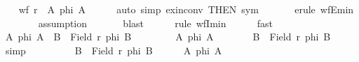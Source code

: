 \begin{isabellebody}
\ \ \isamarkupfalse%
\ {\isachardoublequoteopen}wf\ r\ {\isasymlongleftrightarrow}\ {\isacharparenleft}{\kern0pt}{\isasymforall}A{\isachardot}{\kern0pt}\ {\isacharquery}{\kern0pt}phi\ A{\isacharparenright}{\kern0pt}{\isachardoublequoteclose}\isanewline
\ \ \ \ \isamarkupfalse%
\ {\isacharparenleft}{\kern0pt}auto\ simp{\isacharcolon}{\kern0pt}\ ex{\isacharunderscore}{\kern0pt}in{\isacharunderscore}{\kern0pt}conv\ {\isacharbrackleft}{\kern0pt}THEN\ sym{\isacharbrackright}{\kern0pt}{\isacharparenright}{\kern0pt}\isanewline
\ \ \ \ \ \isamarkupfalse%
\ {\isacharparenleft}{\kern0pt}erule\ wfE{\isacharunderscore}{\kern0pt}min{\isacharparenright}{\kern0pt}\isanewline
\ \ \ \ \ \ \isamarkupfalse%
\ assumption\isanewline
\ \ \ \ \ \isamarkupfalse%
\ blast\isanewline
\ \ \ \ \isamarkupfalse%
\ {\isacharparenleft}{\kern0pt}rule\ wfI{\isacharunderscore}{\kern0pt}min{\isacharparenright}{\kern0pt}\isanewline
\ \ \ \ \isamarkupfalse%
\ fast\isanewline
\ \ \ \ \isamarkupfalse%
\isanewline
\ \ \isamarkupfalse%
\ \isamarkupfalse%
\ {\isachardoublequoteopen}{\isacharparenleft}{\kern0pt}{\isasymforall}A{\isachardot}{\kern0pt}\ {\isacharquery}{\kern0pt}phi\ A{\isacharparenright}{\kern0pt}\ {\isasymlongleftrightarrow}\ {\isacharparenleft}{\kern0pt}{\isasymforall}B\ {\isasymsubseteq}\ Field\ r{\isachardot}{\kern0pt}\ {\isacharquery}{\kern0pt}phi\ B{\isacharparenright}{\kern0pt}{\isachardoublequoteclose}\isanewline
\ \ \isamarkupfalse%
\isanewline
\ \ \ \ \isamarkupfalse%
\ {\isachardoublequoteopen}{\isasymforall}A{\isachardot}{\kern0pt}\ {\isacharquery}{\kern0pt}phi\ A{\isachardoublequoteclose}\isanewline
\ \ \ \ \isamarkupfalse%
\ \isamarkupfalse%
\ {\isachardoublequoteopen}{\isasymforall}B\ {\isasymsubseteq}\ Field\ r{\isachardot}{\kern0pt}\ {\isacharquery}{\kern0pt}phi\ B{\isachardoublequoteclose}\ \isamarkupfalse%
\ simp\isanewline
\ \ \isamarkupfalse%
\isanewline
\ \ \ \ \isamarkupfalse%
\ {\isacharasterisk}{\kern0pt}{\isacharcolon}{\kern0pt}\ {\isachardoublequoteopen}{\isasymforall}B\ {\isasymsubseteq}\ Field\ r{\isachardot}{\kern0pt}\ {\isacharquery}{\kern0pt}phi\ B{\isachardoublequoteclose}\isanewline
\ \ \ \ \isamarkupfalse%
\ {\isachardoublequoteopen}{\isasymforall}A{\isachardot}{\kern0pt}\ {\isacharquery}{\kern0pt}phi\ A{\isachardoublequoteclose}\isanewline

\end{isabellebody}
